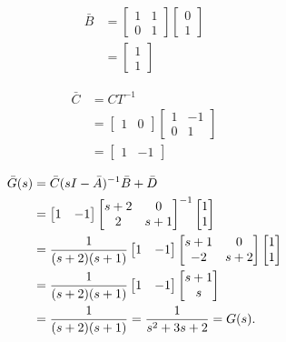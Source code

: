 \documentclass[12pt,a4paper]{article}
\begin{document}
\begin{align*}
	\bar B &= \begin{bmatrix}
		1 & 1 \\ 0 & 1
	\end{bmatrix}\begin{bmatrix}
	0 \\ 1
	\end{bmatrix} \\
	&= \begin{bmatrix}
		1 \\ 1
	\end{bmatrix}
\end{align*}

\begin{align*}
	\bar C &= CT^{-1} \\
	&= \begin{bmatrix}
		1 & 0
	\end{bmatrix} \begin{bmatrix}
	1 & -1 \\ 0 & 1
	\end{bmatrix} \\ &= \begin{bmatrix}
	1 & -1
	\end{bmatrix}
\end{align*}

\begin{align*}
	\bar G(s) &= \bar C ( s I - \bar A)^{-1} \bar B + \bar D \\
	&= \begin{bmatrix}
		1 & -1
	\end{bmatrix} \begin{bmatrix}
	s + 2 &  0 \\ 
	2 & s + 1
	\end{bmatrix}^{-1} \begin{bmatrix}
	1 \\ 1
	\end{bmatrix} \\
	&= {1\over (s+2)(s+1)} \begin{bmatrix}
		1 & -1
	\end{bmatrix} \begin{bmatrix}
		s+1 & 0 \\ -2 & s+2
	\end{bmatrix} \begin{bmatrix}
	1 \\ 1
	\end{bmatrix} \\
	&= {1\over (s+2)(s+1)} \begin{bmatrix}
		1 & -1
	\end{bmatrix} \begin{bmatrix}
		s+1 \\ s
	\end{bmatrix} \\
	&= {1\over (s+2)(s+1)}
	= {1\over s^2+3s+2}
	= G(s).
\end{align*}
\end{document}
